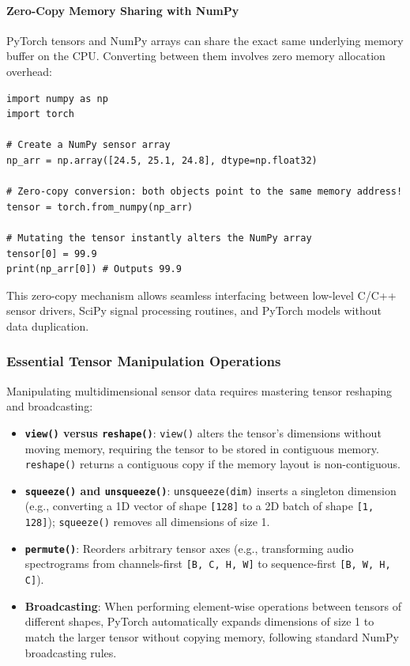 \paragraph{Zero-Copy Memory Sharing with NumPy}
PyTorch tensors and NumPy arrays can share the exact same underlying memory buffer on the CPU. Converting between them involves zero memory allocation overhead:
\begin{lstlisting}[style=pythonstyle]
import numpy as np
import torch

# Create a NumPy sensor array
np_arr = np.array([24.5, 25.1, 24.8], dtype=np.float32)

# Zero-copy conversion: both objects point to the same memory address!
tensor = torch.from_numpy(np_arr)

# Mutating the tensor instantly alters the NumPy array
tensor[0] = 99.9
print(np_arr[0]) # Outputs 99.9
\end{lstlisting}
This zero-copy mechanism allows seamless interfacing between low-level C/C++ sensor drivers, SciPy signal processing routines, and PyTorch models without data duplication.

\subsubsection{Essential Tensor Manipulation Operations}

Manipulating multidimensional sensor data requires mastering tensor reshaping and broadcasting:
\begin{itemize}
    \item \textbf{\texttt{view()} versus \texttt{reshape()}}: \texttt{view()} alters the tensor's dimensions without moving memory, requiring the tensor to be stored in contiguous memory. \texttt{reshape()} returns a contiguous copy if the memory layout is non-contiguous.
    \item \textbf{\texttt{squeeze()} and \texttt{unsqueeze()}}: \texttt{unsqueeze(dim)} inserts a singleton dimension (e.g., converting a 1D vector of shape \texttt{[128]} to a 2D batch of shape \texttt{[1, 128]}); \texttt{squeeze()} removes all dimensions of size 1.
    \item \textbf{\texttt{permute()}}: Reorders arbitrary tensor axes (e.g., transforming audio spectrograms from channels-first \texttt{[B, C, H, W]} to sequence-first \texttt{[B, W, H, C]}).
    \item \textbf{Broadcasting}: When performing element-wise operations between tensors of different shapes, PyTorch automatically expands dimensions of size 1 to match the larger tensor without copying memory, following standard NumPy broadcasting rules.
\end{itemize}

